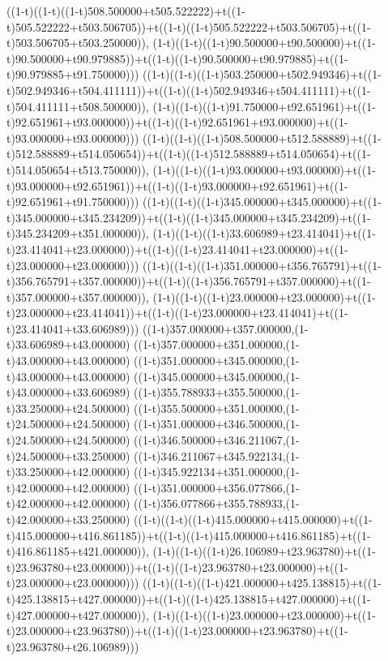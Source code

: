 ((1-t)((1-t)((1-t)508.500000+t505.522222)+t((1-t)505.522222+t503.506705))+t((1-t)((1-t)505.522222+t503.506705)+t((1-t)503.506705+t503.250000)),                                     (1-t)((1-t)((1-t)90.500000+t90.500000)+t((1-t)90.500000+t90.979885))+t((1-t)((1-t)90.500000+t90.979885)+t((1-t)90.979885+t91.750000)))
((1-t)((1-t)((1-t)503.250000+t502.949346)+t((1-t)502.949346+t504.411111))+t((1-t)((1-t)502.949346+t504.411111)+t((1-t)504.411111+t508.500000)),                                     (1-t)((1-t)((1-t)91.750000+t92.651961)+t((1-t)92.651961+t93.000000))+t((1-t)((1-t)92.651961+t93.000000)+t((1-t)93.000000+t93.000000)))
((1-t)((1-t)((1-t)508.500000+t512.588889)+t((1-t)512.588889+t514.050654))+t((1-t)((1-t)512.588889+t514.050654)+t((1-t)514.050654+t513.750000)),                                     (1-t)((1-t)((1-t)93.000000+t93.000000)+t((1-t)93.000000+t92.651961))+t((1-t)((1-t)93.000000+t92.651961)+t((1-t)92.651961+t91.750000)))
((1-t)((1-t)((1-t)345.000000+t345.000000)+t((1-t)345.000000+t345.234209))+t((1-t)((1-t)345.000000+t345.234209)+t((1-t)345.234209+t351.000000)),                                     (1-t)((1-t)((1-t)33.606989+t23.414041)+t((1-t)23.414041+t23.000000))+t((1-t)((1-t)23.414041+t23.000000)+t((1-t)23.000000+t23.000000)))
((1-t)((1-t)((1-t)351.000000+t356.765791)+t((1-t)356.765791+t357.000000))+t((1-t)((1-t)356.765791+t357.000000)+t((1-t)357.000000+t357.000000)),                                     (1-t)((1-t)((1-t)23.000000+t23.000000)+t((1-t)23.000000+t23.414041))+t((1-t)((1-t)23.000000+t23.414041)+t((1-t)23.414041+t33.606989)))
((1-t)357.000000+t357.000000,(1-t)33.606989+t43.000000)
((1-t)357.000000+t351.000000,(1-t)43.000000+t43.000000)
((1-t)351.000000+t345.000000,(1-t)43.000000+t43.000000)
((1-t)345.000000+t345.000000,(1-t)43.000000+t33.606989)
((1-t)355.788933+t355.500000,(1-t)33.250000+t24.500000)
((1-t)355.500000+t351.000000,(1-t)24.500000+t24.500000)
((1-t)351.000000+t346.500000,(1-t)24.500000+t24.500000)
((1-t)346.500000+t346.211067,(1-t)24.500000+t33.250000)
((1-t)346.211067+t345.922134,(1-t)33.250000+t42.000000)
((1-t)345.922134+t351.000000,(1-t)42.000000+t42.000000)
((1-t)351.000000+t356.077866,(1-t)42.000000+t42.000000)
((1-t)356.077866+t355.788933,(1-t)42.000000+t33.250000)
((1-t)((1-t)((1-t)415.000000+t415.000000)+t((1-t)415.000000+t416.861185))+t((1-t)((1-t)415.000000+t416.861185)+t((1-t)416.861185+t421.000000)),                                     (1-t)((1-t)((1-t)26.106989+t23.963780)+t((1-t)23.963780+t23.000000))+t((1-t)((1-t)23.963780+t23.000000)+t((1-t)23.000000+t23.000000)))
((1-t)((1-t)((1-t)421.000000+t425.138815)+t((1-t)425.138815+t427.000000))+t((1-t)((1-t)425.138815+t427.000000)+t((1-t)427.000000+t427.000000)),                                     (1-t)((1-t)((1-t)23.000000+t23.000000)+t((1-t)23.000000+t23.963780))+t((1-t)((1-t)23.000000+t23.963780)+t((1-t)23.963780+t26.106989)))
